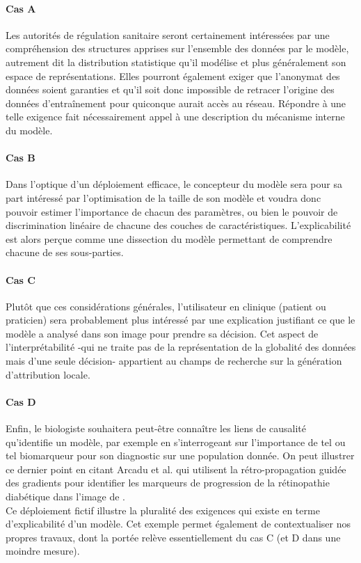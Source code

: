 \paragraph{Cas A} Les autorités de régulation sanitaire seront certainement intéressées par une compréhension des structures apprises sur l'ensemble des données par le modèle, autrement dit la distribution statistique qu'il modélise et plus généralement son espace de représentations. Elles pourront également exiger que l'anonymat des données soient garanties et qu'il soit donc impossible de retracer l'origine des données d'entraînement pour quiconque aurait accès au réseau. Répondre à une telle exigence fait nécessairement appel à une description du mécanisme interne du modèle. 
\paragraph{Cas B}
Dans l'optique d'un déploiement efficace, le concepteur du modèle sera pour sa part intéressé par l'optimisation de la taille de son modèle et voudra donc pouvoir estimer l'importance de chacun des paramètres, ou bien le pouvoir de discrimination linéaire de chacune des couches de caractéristiques. L'explicabilité est alors perçue comme une dissection du modèle permettant de comprendre chacune de ses sous-parties.
\paragraph{Cas C}
Plutôt que ces considérations générales, l'utilisateur en clinique (patient ou praticien) sera probablement plus intéressé par une explication justifiant ce que le modèle a analysé dans son image pour prendre sa décision. Cet aspect de l'interprétabilité -qui ne traite pas de la représentation de la globalité des données mais d'une seule décision- appartient au champs de recherche sur la génération d'attribution locale. 
\paragraph{Cas D}
Enfin, le biologiste souhaitera peut-être connaître les liens de causalité qu'identifie un modèle, par exemple en s'interrogeant sur l'importance de tel ou tel biomarqueur pour son diagnostic sur une population donnée. On peut illustrer ce dernier point en citant Arcadu et al. \cite{arcaduDeepLearningAlgorithm2019} qui utilisent la rétro-propagation guidée des gradients pour identifier les marqueurs de progression de la rétinopathie diabétique dans l'image de \fundus.
\\ 
Ce déploiement fictif illustre la pluralité des exigences qui existe en terme d'explicabilité d'un modèle. Cet exemple permet également de contextualiser nos propres travaux, dont la portée relève essentiellement du cas C (et D dans une moindre mesure).


